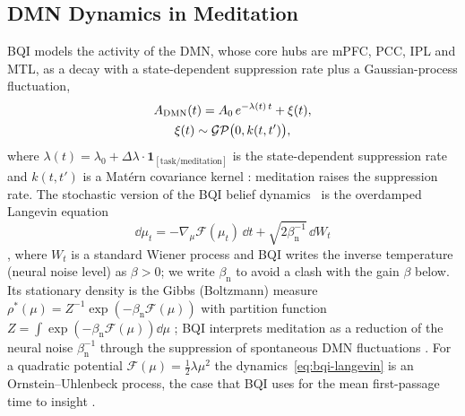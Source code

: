 \subsection{DMN Dynamics in Meditation}
\label{sec:theory-dmn}
BQI models the activity of the DMN, whose core hubs are mPFC, PCC, IPL and MTL, as a decay with a state-dependent suppression rate plus a Gaussian-process fluctuation,
\begin{equation}
  \begin{gathered}
  A_{\mathrm{DMN}}(t)=A_0\,e^{-\lambda(t)\,t}+\xi(t),\\
  \xi(t)\sim\mathcal{GP}\bigl(0,k(t,t')\bigr),
  \end{gathered}
  \label{eq:bqi-dmn}
\end{equation}
where $\lambda(t)=\lambda_0+\Delta\lambda\cdot\mathbf 1_{[\text{task/meditation}]}$ is the state-dependent suppression rate and $k(t,t')$ is a Mat\'ern covariance kernel \cite[Sec.~7.1, eq.~(51)]{BQI}: meditation raises the suppression rate. The stochastic version of the BQI belief dynamics~\cite[eq.~(7)]{BQI} is the overdamped Langevin equation
\begin{equation}
  \dd\mu_t=-\nabla_\mu\mathcal F(\mu_t)\,\dd t+\sqrt{2\beta_{\mathrm n}^{-1}}\,\dd W_t
  \label{eq:bqi-langevin}
\end{equation}
\cite[Sec.~12.2.1, eq.~(83)]{BQI}, where $W_t$ is a standard Wiener process and BQI writes the inverse temperature (neural noise level) as $\beta>0$; we write $\beta_{\mathrm n}$ to avoid a clash with the gain $\beta$ below. Its stationary density is the Gibbs (Boltzmann) measure $\rho^*(\mu)=Z^{-1}\exp(-\beta_{\mathrm n}\mathcal F(\mu))$ with partition function $Z=\int\exp(-\beta_{\mathrm n}\mathcal F(\mu))\dd\mu$ \cite[eq.~(85)]{BQI}; BQI interprets meditation as a reduction of the neural noise $\beta_{\mathrm n}^{-1}$ through the suppression of spontaneous DMN fluctuations \cite[Corollary~12.1]{BQI}. For a quadratic potential $\mathcal F(\mu)=\tfrac12\lambda\mu^2$ the dynamics~\eqref{eq:bqi-langevin} is an Ornstein--Uhlenbeck process, the case that BQI uses for the mean first-passage time to insight \cite[Sec.~12.2.2, eqs.~(86)--(87)]{BQI}.

